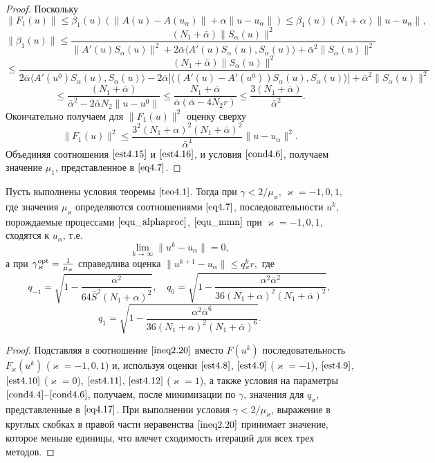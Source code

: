 \begin{proof}
Поскольку
$$\|F_1(u)\|\le\beta_1(u)(\|A(u)-A(u_\alpha)\|+\alpha\|u-u_\alpha\|)\le \beta_1(u)(N_1+\alpha)\|u-u_\alpha\|,$$ $$\|\beta_1(u)\|\le\frac{(N_1+\bar\alpha)\|S_\alpha(u)\|^2}{\|A'(u)S_\alpha(u)\|^2+2\bar\alpha\langle A'(u)S_\alpha(u), S_\alpha(u)\rangle+\bar\alpha^2\|S_\alpha(u)\|^2}$$ $$\le\frac{(N_1+\bar\alpha)\|S_\alpha(u)\|^2}{2\bar\alpha\langle A'(u^0)S_\alpha(u), S_\alpha(u)\rangle-2\bar\alpha|\langle (A'(u)-A'(u^0))S_\alpha(u), S_\alpha(u)\rangle|+\bar\alpha^2\|S_\alpha(u)\|^2}$$$$
\le\frac{(N_1+\bar\alpha)}{\bar\alpha^2-2\bar\alpha N_2\|u-u^0\|}\le\frac{N_1+\bar\alpha}{\bar\alpha(\bar\alpha - 4N_2 r)}\le\frac{3(N_1+\bar\alpha)}{\bar\alpha^2}.$$
Окончательно получаем для $\|F_1(u)\|^2$ оценку сверху
\begin{equation}\label{est4.16}
\|F_1(u)\|^2\le\frac{3^2(N_1+\alpha)^2(N_1+\bar\alpha)^2}{\bar\alpha^4}\|u-u_\alpha\|^2.
\end{equation}
Объединяя соотношения $\eqref{est4.15}$ и $\eqref{est4.16}$, и условия $\eqref{cond4.6}$, получаем значение $\mu_1$, представленное в $\eqref{eq4.7}$.
\end{proof}
\begin{theorem}\label{teo4.3}
	Пусть выполнены условия теоремы $\ref{teo4.1}$. Тогда при $\gamma<2/\mu _\varkappa$, $\varkappa=-1,0,1$, где значения $\mu _\varkappa$ определяются соотношениями $\eqref{eq4.7}$, последовательности ${u^k}$, порождаемые процессами $\eqref{equ_alphaproc}$, $\eqref{equ_mmn}$ при $\varkappa=-1,0,1$, сходятся к $u_\alpha$, т.е. $$\lim_{k\to\infty}\|u^k-u_\alpha\|=0,$$ а при $
	\gamma{_\varkappa^{\textnormal{opt}}}=\frac{1}{\mu_\varkappa}$
	справедлива оценка $\|u^{k+1}-u_\alpha\|\le q{_\varkappa^k}r,$ где
	$$
	q_{-1}=\sqrt{1-\frac{\alpha^2}{64\bar S^2(N_1+\alpha)^2}}, \quad q_0=\sqrt{1-\frac{\alpha^2\bar\alpha^2}{36(N_1+\alpha)^2(N_1+\bar\alpha)^2}},$$
	\begin{equation}\label{eq4.17}
	q_1=\sqrt{1-\frac{\alpha^2\bar\alpha^6}{36(N_1+\alpha)^2(N_1+\bar\alpha)^6}}.
	\end{equation}
\end{theorem}
\newpage
\begin{proof} Подставляя в соотношение $\eqref{ineq2.20}$ вместо $F(u^k)$ последовательность $F_\varkappa(u^k)$ ($\varkappa=-1,0,1$) и, используя оценки $\eqref{est4.8}$, $\eqref{est4.9}$ ($\varkappa=-1$), $\eqref{est4.9}$, $\eqref{est4.10}$ ($\varkappa=0$), $\eqref{est4.11}$, $\eqref{est4.12}$ ($\varkappa=1$), а также условия на параметры $\eqref{cond4.4}$--$\eqref{cond4.6}$, получаем, после минимизации по $\gamma$, значения для $q_\varkappa$, представленные в $\eqref{eq4.17}$. При выполнении условия $\gamma<2/\mu_\varkappa$, выражение в круглых скобках в правой части неравенства $\eqref{ineq2.20}$ принимает значение, которое меньше единицы, что влечет сходимость итераций для всех трех методов.
\end{proof}

